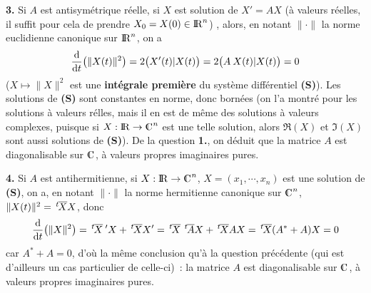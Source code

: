 \documentclass{article}
\begin{document}
\msk
{\bf 3.} Si $A$ est antisym\'etrique r\'eelle, si $X$ est solution de $X'=AX$ (\`a valeurs r\'eelles, il suffit pour cela de prendre $X_0=X(0)\in{\rm I\kern-0.6mm R}^n$) , alors, en notant $\|\cdot\|$ la norme euclidienne canonique sur ${\rm I\kern-0.6mm R}^n$, on a\vv
$${{\rm d}\over{\rm d}t}\big(\|X(t)\|^2\big)=2\big(X'(t)|X(t)\big)=2\big(A\>X(t)|X(t)\big)=0$$
($X\mapsto\|X\|^2$ est une {\bf int\'egrale premi\`ere} du syst\`eme diff\'erentiel {\bf (S)}). Les solutions de {\bf (S)} sont constantes en norme, donc born\'ees (on l'a montr\'e pour les solutions \`a valeurs r\'elles, mais il en est de m\^eme des solutions \`a valeurs complexes, puisque si $X:\rmat\vers\cmat^n$ est une telle solution, alors $\Re(X)$ et $\Im(X)$ sont aussi solutions de {\bf (S)}). De la question {\bf 1.}, on d\'eduit que la matrice $A$ est diagonalisable sur $\cmat$, \`a valeurs propres imaginaires pures.

\msk
{\bf 4.} Si $A$ est antihermitienne, si $X:\rmat\vers\cmat^n$, $X=(x_1,\cdots,x_n)$ est une solution de {\bf (S)}, on a, en notant $\|\cdot\|$ la norme hermitienne canonique sur $\cmat^n$, $\|X(t)\|^2=\,{}^t\!\!\>\overline{X}X$, donc\vv
$${{\rm d}\s{\rm d}t}\big(\|X\|^2\big)=\t\>\ov{X}\>'X+\t\>\ov{X}X'=\t\>\ov{X}\>\t\>\ov{A}X+\t\>\ov{X}AX=\t\>\ov{X}(A^*+A)X=0$$
car $A^*+A=0$, d'o\`u la m\^eme conclusion qu'\`a la question pr\'ec\'edente (qui est d'ailleurs un cas particulier de celle-ci)~: la matrice $A$ est diagonalisable sur $\cmat$, \`a valeurs propres imaginaires pures.
\end{document}
